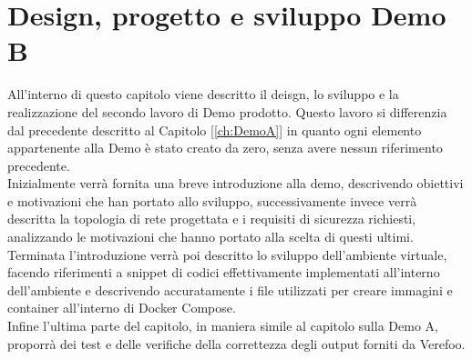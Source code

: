 

\chapter{Design, progetto e sviluppo Demo B} \label{ch:DemoB}
All'interno di questo capitolo viene descritto il deisgn, lo sviluppo e la realizzazione del secondo lavoro di Demo prodotto.
Questo lavoro si differenzia dal precedente descritto al Capitolo [\ref{ch:DemoA}] in quanto ogni elemento appartenente alla Demo è stato creato da zero,
senza avere nessun riferimento precedente.\\
Inizialmente verrà fornita una breve introduzione alla demo, descrivendo obiettivi e motivazioni che han portato allo sviluppo, successivamente invece verrà
descritta la topologia di rete progettata e i requisiti di sicurezza richiesti, analizzando le motivazioni che hanno portato alla scelta di questi ultimi.\\
Terminata l'introduzione verrà poi descritto lo sviluppo dell'ambiente virtuale, facendo riferimenti a snippet di codici effettivamente implementati all'interno dell'ambiente e 
descrivendo accuratamente i file utilizzati per creare immagini e container all'interno di Docker Compose.\\
Infine l'ultima parte del capitolo, in maniera simile al capitolo sulla Demo A, proporrà dei test e delle verifiche della correttezza degli output forniti da Verefoo.

